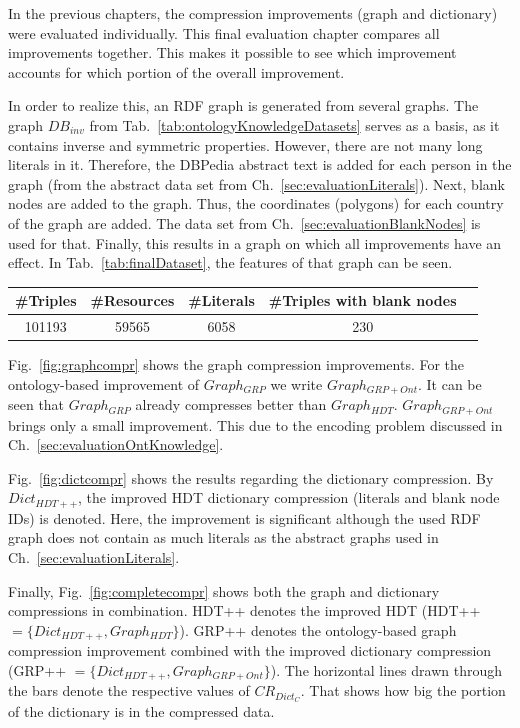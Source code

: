 In the previous chapters, the compression improvements (graph and dictionary) were evaluated individually. This final evaluation chapter compares all improvements together. This makes it possible to see which improvement accounts for which portion of the overall improvement. 

In order to realize this, an RDF graph is generated from several graphs. The graph $DB_{inv}$ from Tab.~\ref{tab:ontologyKnowledgeDatasets} serves as a basis, as it contains inverse and symmetric properties. However, there are not many long literals in it. Therefore, the DBPedia abstract text is added for each person in the graph (from the abstract data set from Ch.~\ref{sec:evaluationLiterals}). Next, blank nodes are added to the graph. Thus, the coordinates (polygons) for each country of the graph are added. The data set from Ch.~\ref{sec:evaluationBlankNodes} is used for that. Finally, this results in a graph on which all improvements have an effect. In Tab.~\ref{tab:finalDataset}, the features of that graph can be seen.

\begin{center}
	\begin{tabular}{|c|c|c|c|c|}
		\hline 
		 \#Triples & \#Resources & \#Literals & \#Triples with blank nodes \\ 
		\hline
		101193 &59565 & 6058 & 230 \\
		\hline 
	\end{tabular} 
	\label{tab:finalDataset}
\end{center}

Fig.~\ref{fig:graphcompr} shows the graph compression improvements. For the ontology-based improvement of $Graph_{GRP}$ we write $Graph_{GRP+Ont}$.  It can be seen that $Graph_{GRP}$ already compresses better than $Graph_{HDT}$. $Graph_{GRP+Ont}$ brings only a small improvement. This due to the encoding problem discussed in Ch.~\ref{sec:evaluationOntKnowledge}.

Fig.~\ref{fig:dictcompr} shows the results regarding the dictionary compression. By $Dict_{HDT++}$, the improved HDT dictionary compression (literals and blank node IDs) is denoted. Here, the improvement is significant although the used RDF graph does not contain as much literals as the abstract graphs used in Ch.~\ref{sec:evaluationLiterals}. 

Finally, Fig.~\ref{fig:completecompr} shows both the graph and dictionary compressions in combination. HDT++ denotes the improved HDT (HDT++$=\{  Dict_{HDT++}, Graph_{HDT} \} $). GRP++ denotes the ontology-based graph compression improvement combined with the improved dictionary compression (GRP++ $=\{ Dict_{HDT++}, Graph_{GRP+Ont} \}$). The horizontal lines drawn through the bars denote the respective values of $CR_{Dict_C}$. That shows how big the portion of the dictionary is in the compressed data. 

